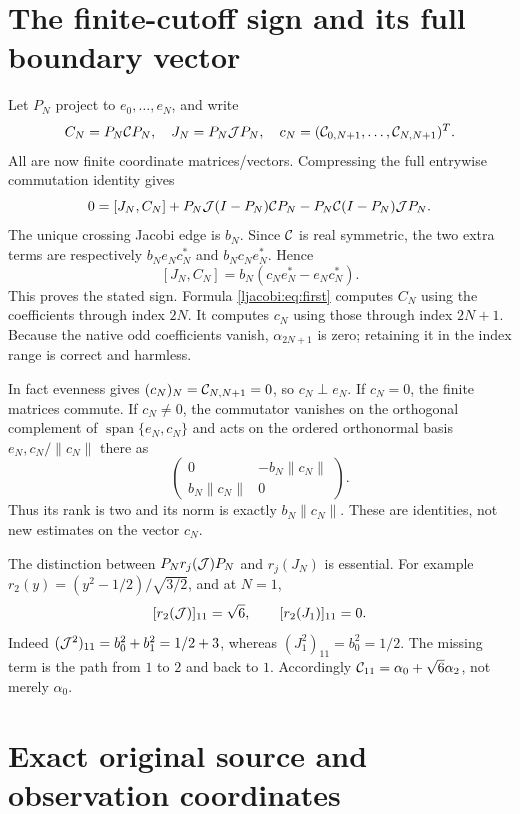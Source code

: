 \documentclass[11pt]{article}
\begin{document}
\section{The finite-cutoff sign and its full boundary vector}

Let $P_N$ project to $e_0,\ldots,e_N$, and write
\[
 C_N=P_N\mathcal C P_N,\quad J_N=P_N\mathcal J P_N,\quad
 c_N=(\mathcal C_{0,N+1},\ldots,\mathcal C_{N,N+1})^T.
\]
All are now finite coordinate matrices/vectors. Compressing the
full entrywise commutation identity gives
\[
 0=[J_N,C_N]+P_N\mathcal J(I-P_N)\mathcal C P_N
                    -P_N\mathcal C(I-P_N)\mathcal J P_N.
\]
The unique crossing Jacobi edge is $b_N$. Since $\mathcal C$ is real
symmetric, the two extra terms are respectively $b_Ne_Nc_N^*$
and $b_Nc_Ne_N^*$. Hence
\begin{equation}\label{ljacobi:eq:cutoff}
 \boxed{[J_N,C_N]=b_N(c_Ne_N^*-e_Nc_N^*).}
\end{equation}
This proves the stated sign. Formula \eqref{ljacobi:eq:first} computes
$C_N$ using the coefficients through index $2N$. It computes $c_N$
using those through index $2N+1$. Because the native odd coefficients
vanish, $\alpha_{2N+1}$ is zero; retaining it in the index range is
correct and harmless.

In fact evenness gives $(c_N)_N=\mathcal C_{N,N+1}=0$, so $c_N\perp e_N$.
If $c_N=0$, the finite matrices commute. If $c_N\ne0$, the
commutator vanishes on the orthogonal complement of
$\operatorname{span}\{e_N,c_N\}$ and acts on the ordered orthonormal
basis $e_N,c_N/\|c_N\|$ there as
\[
 \begin{pmatrix}0&-b_N\|c_N\|\\b_N\|c_N\|&0\end{pmatrix}.
\]
Thus its rank is two and its norm is exactly $b_N\|c_N\|$.
These are identities, not new estimates on the vector $c_N$.

The distinction between $P_Nr_j(\mathcal J)P_N$ and $r_j(J_N)$ is essential.
For example $r_2(y)=(y^2-1/2)/\sqrt{3/2}$, and at $N=1$,
\[
 [r_2(\mathcal J)]_{11}=\sqrt6,\qquad [r_2(J_1)]_{11}=0.
\]
Indeed $(\mathcal J^2)_{11}=b_0^2+b_1^2=1/2+3$, whereas
$(J_1^2)_{11}=b_0^2=1/2$. The missing term is the path from $1$
to $2$ and back to $1$. Accordingly
$\mathcal C_{11}=\alpha_0+\sqrt6\alpha_2$, not merely $\alpha_0$.

\section{Exact original source and observation coordinates}
\end{document}
